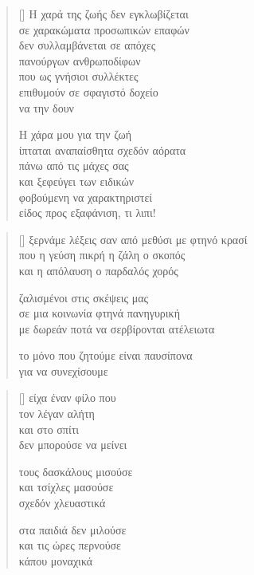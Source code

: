 \documentclass[12pt]{article}
\begin{document}
\newpage

\settowidth{\versewidth}{ίπταται αναπαίσθητα σχεδόν}
\begin{verse}[\versewidth]
  Η χαρά της ζωής δεν εγκλωβίζεται \\
  σε χαρακώματα προσωπικών επαφών \\
  δεν συλλαμβάνεται σε απόχες \\
  πανούργων ανθρωποδίφων \\
  που ως γνήσιοι συλλέκτες \\
  επιθυμούν σε σφαγιστό δοχείο \\
  να την δουν

  Η χάρα μου για την ζωή \\
  ίπταται αναπαίσθητα σχεδόν αόρατα \\
  πάνω από τις μάχες σας \\
  και ξεφεύγει των ειδικών \\
  φοβούμενη να χαρακτηριστεί \\
  είδος προς εξαφάνιση, τι λιπι!
\end{verse}

\newpage

\settowidth{\versewidth}{ξερνάμε λέξεις σαν από μεθύσι με φτηνό}
\begin{verse}[\versewidth]
  ξερνάμε λέξεις σαν από μεθύσι με φτηνό κρασί \\
  που η γεύση πικρή η ζάλη ο σκοπός \\
  και η απόλαυση ο παρδαλός χορός

  ζαλισμένοι στις σκέψεις μας \\
  σε μια κοινωνία φτηνά πανηγυρική \\
  με δωρεάν ποτά να σερβίρονται ατέλειωτα

  το μόνο που ζητούμε είναι παυσίπονα \\
  για να συνεχίσουμε
\end{verse}

\newpage

\settowidth{\versewidth}{τους δασκάλους μισούσε}
\begin{verse}[\versewidth]
  είχα έναν φίλο που \\
  τον λέγαν αλήτη \\
  και στο σπίτι \\
  δεν μπορούσε να μείνει

  τους δασκάλους μισούσε \\
  και τσίχλες μασούσε \\
  σχεδόν χλευαστικά

  στα παιδιά δεν μιλούσε \\
  και τις ώρες περνούσε \\
  κάπου μοναχικά
\end{verse}
\end{document}

